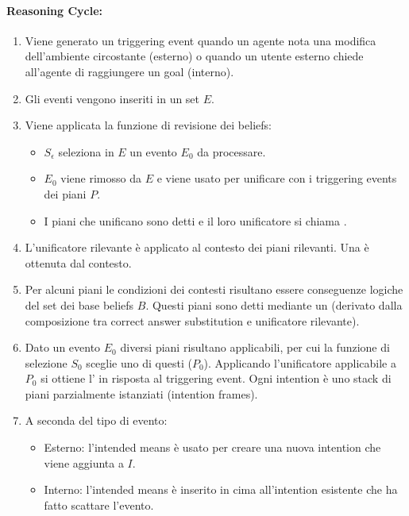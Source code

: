\paragraph{Reasoning Cycle:}

\begin{enumerate}
  \item Viene generato un triggering event quando un agente nota una modifica dell'ambiente circostante (esterno) o quando un utente esterno chiede all'agente di raggiungere un goal (interno). 
  \item Gli eventi vengono inseriti in un set $E$. 
  \item Viene applicata la funzione di revisione dei beliefs:
    \begin{itemize}
      \item $S_\epsilon$ seleziona in $E$ un evento $E_0$ da processare. 
      \item $E_0$ viene rimosso da $E$ e viene usato per unificare con i triggering events dei piani $P$. 
      \item I piani che unificano sono detti  e il loro unificatore si chiama .
    \end{itemize}
  \item L'unificatore rilevante è applicato al contesto dei piani rilevanti. Una  è ottenuta dal contesto. 
  \item Per alcuni piani le condizioni dei contesti risultano essere conseguenze logiche del set dei base beliefs $B$. Questi piani sono detti  mediante un  (derivato dalla composizione tra correct answer substitution e unificatore rilevante).
  \item Dato un evento $E_0$ diversi piani risultano applicabili, per cui la funzione di selezione $S_0$ sceglie uno di questi ($P_0$). Applicando l'unificatore applicabile a $P_0$ si ottiene l' in risposta al triggering event. Ogni intention è uno stack di piani parzialmente istanziati (intention frames). 
  \item A seconda del tipo di evento:
    \begin{itemize}
      \item Esterno: l'intended means è usato per creare una nuova intention che viene aggiunta a $I$. 
      \item Interno: l'intended means è inserito in cima all'intention esistente che ha fatto scattare l'evento.

\end{itemize}
\end{enumerate}
